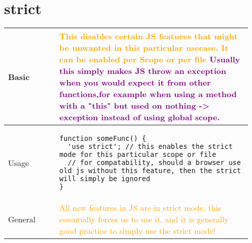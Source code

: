 \documentclass[main.tex,fontsize=8pt,paper=a4,paper=portrait,DIV=calc,]{scrartcl}
\begin{document}
\begin{table}[ht!]
\section{strict}
\begin{tabular}{|m{0.2\linewidth}|m{0.755\linewidth}|}
\hline
Basic & 
\textcolor{orange}{This disables certain JS features that might be unwanted in this particular usecase. \newline
It can be enabled per Scope or per file}\newline
\textcolor{purple}{Usually this simply makes JS throw an exception when you would expect it from other functions,for example when using a method with a "this" but used on nothing -> exception instead of using global scope.}\\
\hline
Usage & 
\begin{lstlisting}
function someFunc() {
  'use strict'; // this enables the strict mode for this particular scope or file
  // for compatability, should a browser use old js without this feature, then the strict will simply be ignored
}
\end{lstlisting}\\
\hline
General & 
\textcolor{orange}{All new features in JS are in strict mode, this essentially forces us to use it, and it is generally good practice to simply use the strict mode!}\\
\hline
\end{tabular}
\end{table}
\pagebreak
\end{document}
